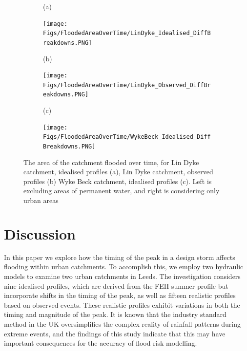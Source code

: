 \documentclass[APA,Times2COL]{WileyNJDv5}
\begin{document}
\begin{figure}[tb]
  \centering
  \begin{subfigure}[b]{\textwidth}
    (a)
  \end{subfigure}
  \begin{subfigure}[t]{0.45\textwidth}
  \texttt{[image: Figs/FloodedAreaOverTime/LinDyke\_Idealised\_DiffBreakdowns.PNG]}
  \end{subfigure}\hfill
  \begin{subfigure}[t]{\textwidth}
    (b)
  \end{subfigure}
  \begin{subfigure}[t]{0.45\textwidth}
\texttt{[image: Figs/FloodedAreaOverTime/LinDyke\_Observed\_DiffBreakdowns.PNG]}
  \end{subfigure}
    \begin{subfigure}[t]{\textwidth}
    (c)
  \end{subfigure}
  \begin{subfigure}[t]{0.45\textwidth}
\texttt{[image: Figs/FloodedAreaOverTime/WykeBeck\_Idealised\_DiffBreakdowns.PNG]}
  \end{subfigure}
 \caption{The area of the catchment flooded over time, for Lin Dyke catchment, idealised profiles (a), Lin Dyke catchment, observed profiles (b) Wyke Beck catchment, idealised profiles (c). Left is excluding areas of permanent water, and right is considering only urban areas }\label{fig:flooded_area_over_time} 
\end{figure}


\section{Discussion}\label{sec:discussion}

In this paper we explore how the timing of the peak in a design storm affects flooding within urban catchments. To accomplish this, we employ two hydraulic models to examine two urban catchments in Leeds. The investigation considers nine idealised profiles, which are derived from the FEH summer profile but incorporate shifts in the timing of the peak, as well as  fifteen realistic profiles based on observed events. These realistic profiles exhibit variations in both the timing and magnitude of the peak. It is known that the industry standard method in the UK oversimplifies the complex reality of rainfall patterns during extreme events, and the findings of this study indicate that this may have important consequences for the accuracy of flood risk modelling.
\end{document}
